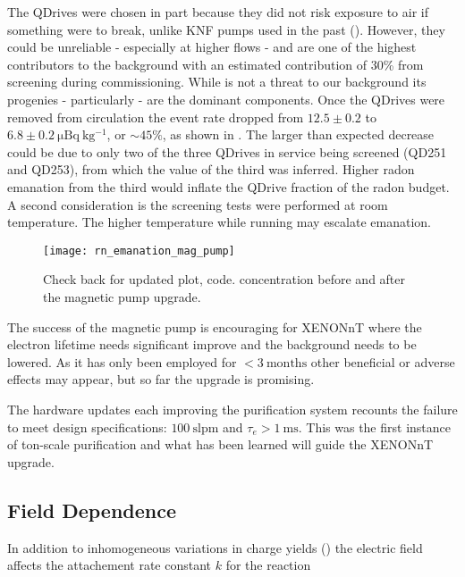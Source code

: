 The QDrives were chosen in part because they did not risk exposure to air if something were to
break, unlike KNF pumps used in the past ().  However, they could be unreliable - especially at higher flows - and
are one of the highest contributors to the 
background with an estimated contribution of 30\% from screening during commissioning.  While  is not a threat to our
background its progenies - particularly  - are the dominant components.  Once the QDrives were removed from circulation the
 event rate dropped from $12.5 \pm 0.2$ to
$6.8 \pm 0.2\ \mathrm{\mu Bq\ kg^{-1}}$, or ${\sim} 45\%$, as shown in .  The larger
than expected decrease could be due to only two of the three
QDrives in service being screened (QD251 and QD253), from which the value of the third was inferred.  Higher radon emanation from the
third would inflate
the QDrive fraction of the radon budget.  A second consideration is the screening tests were performed at room temperature.  The higher
temperature while running may escalate emanation.

\begin{figure}
\centering
\texttt{[image: rn\_emanation\_mag\_pump]}
\caption{Check back for updated plot, code.   concentration before and after the magnetic pump upgrade.}
\label{fig:electron_lifetime_model_ops_rn_emanation}
\end{figure}

The success of the magnetic pump is encouraging for XENONnT where the electron lifetime needs significant improve and the background needs
to be lowered.  As it has only been employed for $< 3\ \mathrm{months}$ other beneficial or adverse effects may appear, but so far the
upgrade is promising.

The hardware updates each improving the purification system recounts the failure to meet design specifications: $100\ \mathrm{slpm}$
and $\tau_e > 1\ \mathrm{ms}$.  This was the first instance of ton-scale purification and what has been learned will guide the XENONnT
upgrade.



\subsection{Field Dependence}
\label{subsec:electron_lifetime_model_field}
In addition to inhomogeneous variations in charge yields () the electric field affects
the attachement rate constant $k$ for the reaction


